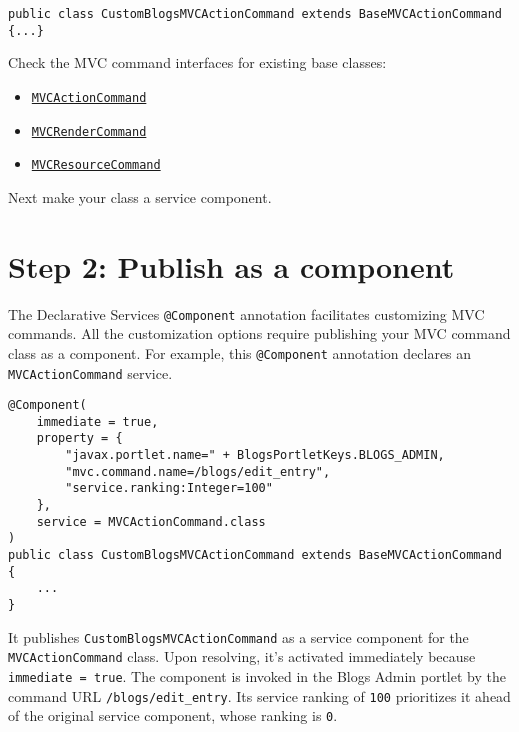 \begin{verbatim}
public class CustomBlogsMVCActionCommand extends BaseMVCActionCommand {...}
\end{verbatim}

Check the MVC command interfaces for existing base classes:

\begin{itemize}
\tightlist
\item
  \href{https://docs.liferay.com/dxp/portal/7.2-latest/javadocs/portal-kernel/com/liferay/portal/kernel/portlet/bridges/mvc/MVCActionCommand.html}{\texttt{MVCActionCommand}}
\item
  \href{https://docs.liferay.com/dxp/portal/7.2-latest/javadocs/portal-kernel/com/liferay/portal/kernel/portlet/bridges/mvc/MVCRenderCommand.html}{\texttt{MVCRenderCommand}}
\item
  \href{https://docs.liferay.com/dxp/portal/7.2-latest/javadocs/portal-kernel/com/liferay/portal/kernel/portlet/bridges/mvc/MVCResourceCommand.html}{\texttt{MVCResourceCommand}}
\end{itemize}

Next make your class a service component.

\section{Step 2: Publish as a
component}\label{step-2-publish-as-a-component}

The Declarative Services \texttt{@Component} annotation facilitates
customizing MVC commands. All the customization options require
publishing your MVC command class as a component. For example, this
\texttt{@Component} annotation declares an \texttt{MVCActionCommand}
service.

\begin{verbatim}
@Component(
    immediate = true,
    property = { 
        "javax.portlet.name=" + BlogsPortletKeys.BLOGS_ADMIN, 
        "mvc.command.name=/blogs/edit_entry",
        "service.ranking:Integer=100" 
    }, 
    service = MVCActionCommand.class
)
public class CustomBlogsMVCActionCommand extends BaseMVCActionCommand {
    ...
} 
\end{verbatim}

It publishes \texttt{CustomBlogsMVCActionCommand} as a service component
for the \texttt{MVCActionCommand} class. Upon resolving, it's activated
immediately because \texttt{immediate\ =\ true}. The component is
invoked in the Blogs Admin portlet by the command URL
\texttt{/blogs/edit\_entry}. Its service ranking of \texttt{100}
prioritizes it ahead of the original service component, whose ranking is
\texttt{0}.

